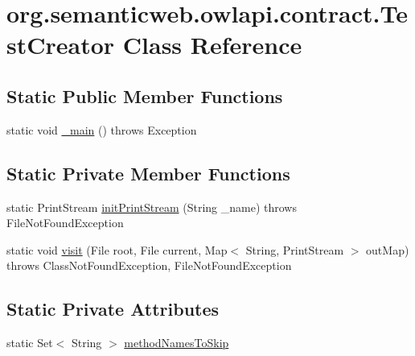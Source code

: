 \hypertarget{classorg_1_1semanticweb_1_1owlapi_1_1contract_1_1_test_creator}{\section{org.\-semanticweb.\-owlapi.\-contract.\-Test\-Creator Class Reference}
\label{classorg_1_1semanticweb_1_1owlapi_1_1contract_1_1_test_creator}
}
\subsection*{Static Public Member Functions}
\begin{DoxyCompactItemize}
\item 
static void \hyperlink{classorg_1_1semanticweb_1_1owlapi_1_1contract_1_1_test_creator_a7c0ef6bd1d0bacc5d0b8cebeb00dc0a2}{\-\_\-main} ()  throws Exception 
\end{DoxyCompactItemize}
\subsection*{Static Private Member Functions}
\begin{DoxyCompactItemize}
\item 
static Print\-Stream \hyperlink{classorg_1_1semanticweb_1_1owlapi_1_1contract_1_1_test_creator_a8637f118bd5c5afc8bb8a530f4dc38fa}{init\-Print\-Stream} (String \-\_\-name)  throws File\-Not\-Found\-Exception 
\item 
static void \hyperlink{classorg_1_1semanticweb_1_1owlapi_1_1contract_1_1_test_creator_a0e48713ec979c2fc676b8cf6fcf52a55}{visit} (File root, File current, Map$<$ String, Print\-Stream $>$ out\-Map)  throws Class\-Not\-Found\-Exception, File\-Not\-Found\-Exception 
\end{DoxyCompactItemize}
\subsection*{Static Private Attributes}
\begin{DoxyCompactItemize}
\item 
static Set$<$ String $>$ \hyperlink{classorg_1_1semanticweb_1_1owlapi_1_1contract_1_1_test_creator_a4c6504d218f17bbcbd84a0f2efb5dfa2}{method\-Names\-To\-Skip}
\end{DoxyCompactItemize}


